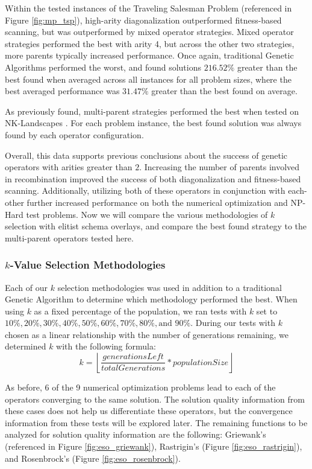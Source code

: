 Within the tested instances of the Traveling Salesman Problem (referenced in Figure \ref{fig:mp_tsp}), high-arity diagonalization outperformed fitness-based scanning, but was outperformed by mixed operator strategies. Mixed operator strategies performed the best with arity 4, but across the other two strategies, more parents typically increased performance. Once again, traditional Genetic Algorithms performed the worst, and found solutions $216.52\%$ greater than the best found when averaged across all instances for all problem sizes, where the best averaged performance was $31.47\%$ greater than the best found on average.

As previously found, multi-parent strategies performed the best when tested on NK-Landscapes \cite{Eiben96}. For each problem instance, the best found solution was always found by each operator configuration.

Overall, this data supports previous conclusions about the success of genetic operators with arities greater than $2$. Increasing the number of parents involved in recombination improved the success of both diagonalization and fitness-based scanning. Additionally, utilizing both of these operators in conjunction with each-other further increased performance on both the numerical optimization and NP-Hard test problems. Now we will compare the various methodologies of $k$ selection with elitist schema overlays, and compare the best found strategy to the multi-parent operators tested here. 

\subsubsection*{$k$-Value Selection Methodologies}
Each of our $k$ selection methodologies was used in addition to a traditional Genetic Algorithm to determine which methodology performed the best. When using $k$ as a fixed percentage of the population, we ran tests with $k$ set to $10\%, 20\%, 30\%, 40\%, 50\%, 60\%, 70\%, 80\%,\text{and } 90\%$. During our tests with $k$ chosen as a linear relationship with the number of generations remaining, we determined $k$ with the following formula:
\[
k = \left\lfloor \frac{generationsLeft}{totalGenerations} * populationSize \right\rfloor
\]

As before, 6 of the 9 numerical optimization problems lead to each of the operators converging to the same solution. The solution quality information from these cases does not help us differentiate these operators, but the convergence information from these tests will be explored later. The remaining functions to be analyzed for solution quality information are the following: Griewank's (referenced in Figure \ref{fig:eso_griewank}), Rastrigin's (Figure \ref{fig:eso_rastrigin}), and Rosenbrock's (Figure \ref{fig:eso_rosenbrock}).

